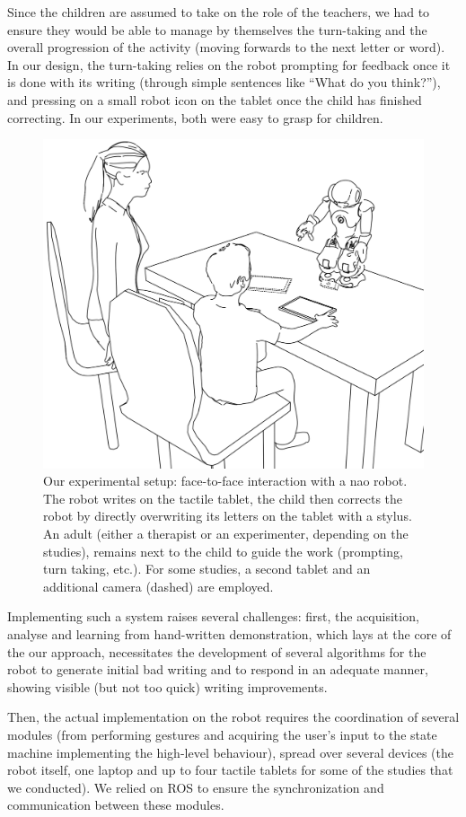 \documentclass{article}
\begin{document}
Since the children are assumed to take on the role of the teachers, we had to ensure
they would be able to manage by themselves the turn-taking and the overall
progression of the activity (moving forwards to the next letter or word). In our design,
the turn-taking relies on the robot prompting for feedback once it is done with
its writing (through simple sentences like ``What do you think?''), and pressing on a
small robot icon on the tablet once the child has finished correcting. In our
experiments, both were easy to grasp for children.


\begin{figure}
    \centering
    \includegraphics[width=0.6\columnwidth]{experimental_setup}
    \caption{\small Our experimental setup: face-to-face interaction with a {\sc
        nao} robot.  The robot writes on the tactile tablet, the child then
        corrects the robot by directly overwriting its letters on the tablet
        with a stylus. An adult (either a therapist or an experimenter,
        depending on the studies), remains next to the child to guide the work
        (prompting, turn taking, etc.). For some studies, a second tablet and an
        additional camera (dashed) are employed.}

    \label{experimental_setup}
\end{figure}

Implementing such a system raises several challenges: first, the acquisition,
analyse and learning from hand-written demonstration, which lays at the core of the
our approach, necessitates the development of several algorithms for the robot to generate
initial bad writing and to respond in an adequate manner, showing visible (but
not too quick) writing improvements.

Then, the actual implementation on the robot requires the coordination of
several modules (from performing gestures and acquiring the user's input to
the state machine implementing the high-level behaviour), spread over several devices (the robot itself,
one laptop and up to four tactile tablets for some of the studies that we conducted). We
relied on ROS to ensure the synchronization and communication between these
modules.
\end{document}
